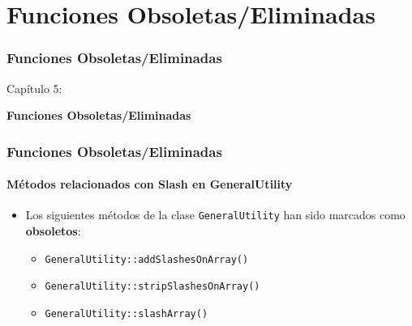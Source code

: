 %

\section{Funciones Obsoletas/Eliminadas}
\begin{frame}[fragile]
	\frametitle{Funciones Obsoletas/Eliminadas}

	\begin{center}\huge{Capítulo 5:}\end{center}
	\begin{center}\huge{\color{typo3darkgrey}\textbf{Funciones Obsoletas/Eliminadas}}\end{center}

\end{frame}


\begin{frame}[fragile]
	\frametitle{Funciones Obsoletas/Eliminadas}
	\framesubtitle{Métodos relacionados con Slash en GeneralUtility}

	\begin{itemize}

		\item Los siguientes métodos de la clase \texttt{GeneralUtility} han sido marcados
			como \textbf{obsoletos}:

			\begin{itemize}
				\item \texttt{GeneralUtility::addSlashesOnArray()}
				\item \texttt{GeneralUtility::stripSlashesOnArray()}
				\item \texttt{GeneralUtility::slashArray()}
			\end{itemize}

	\end{itemize}

\end{frame}

